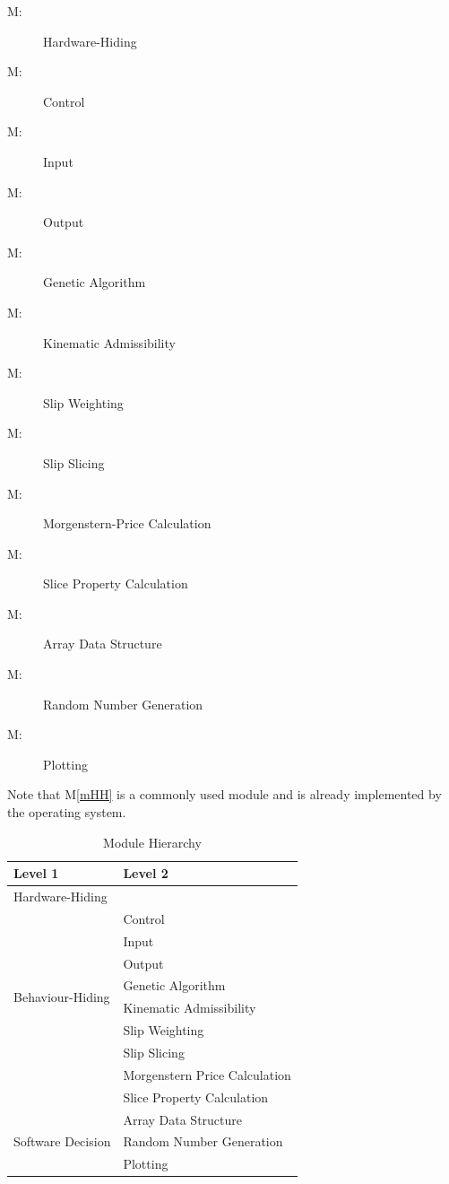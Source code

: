 \documentclass[12pt, titlepage]{article}
\newcounter{mnum}
\newcommand{\mthemnum}{M\themnum}
\newcommand{\mref}[1]{M\ref{#1}}
\begin{document}
\begin{description}
\item [ \mthemnum \label{mHH}:] Hardware-Hiding
\item [ \mthemnum \label{mControl}:] Control
\item [ \mthemnum \label{mInput}:] Input
\item [ \mthemnum \label{mOutput}:] Output
\item [ \mthemnum \label{mGenAlg}:] Genetic
  Algorithm
\item [ \mthemnum \label{mKinAdm}:] Kinematic
  Admissibility
\item [ \mthemnum \label{mSlipWeight}:] Slip Weighting
\item [ \mthemnum \label{mSlipSlicer}:] Slip Slicing
\item [ \mthemnum \label{mMorgPrice}:]
  Morgenstern-Price Calculation
\item [ \mthemnum \label{mSliceProperty}:] Slice
  Property Calculation
\item [ \mthemnum \label{mArrayOps}:] Array Data Structure
\item [ \mthemnum \label{mRandNum}:] Random Number     
Generation
\item [ \mthemnum \label{mPlot}:] Plotting
\end{description}

Note that \mref{mHH} is a commonly used module and is already
implemented by the operating system.

\begin{table}[h!]
\centering
\begin{tabular}{p{} p{} }
\toprule
\textbf{Level 1} & \textbf{Level 2} \\
\midrule

{Hardware-Hiding} & ~ \\
\midrule

\multirow{8}{0.3\textwidth}{Behaviour-Hiding} &
Control \\
& Input \\
& Output \\
& Genetic Algorithm \\
& Kinematic Admissibility \\
& Slip Weighting \\
& Slip Slicing \\
& Morgenstern Price Calculation \\
& Slice Property Calculation \\
\midrule

\multirow{3}{0.3\textwidth}{Software Decision} &
Array Data Structure \\
& Random Number Generation \\
& Plotting \\
\bottomrule

\end{tabular}
\caption{Module Hierarchy}
\label{Table:Decomp}
\end{table}
\end{document}
